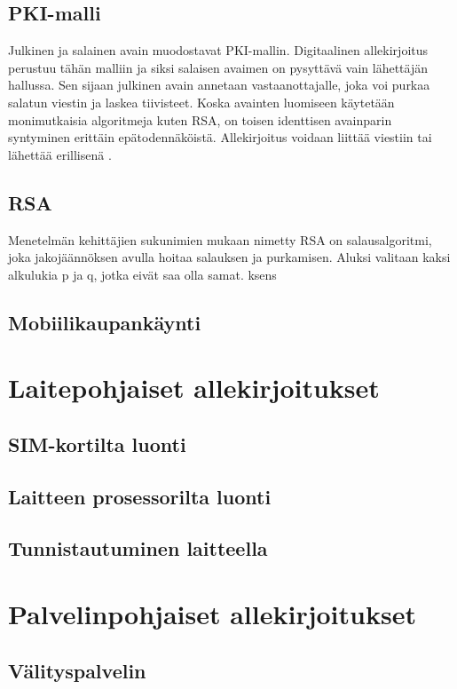 \documentclass[finnish]{tktltiki2}
\theoremstyle{definition}
\theoremstyle{remark}
\begin{document}
\subsection{PKI-malli}

Julkinen ja salainen avain muodostavat PKI-mallin. Digitaalinen allekirjoitus perustuu tähän malliin ja siksi salaisen avaimen on pysyttävä vain lähettäjän hallussa. Sen sijaan julkinen avain annetaan vastaanottajalle, joka voi purkaa salatun viestin ja laskea tiivisteet. Koska avainten luomiseen käytetään monimutkaisia algoritmeja kuten RSA, on toisen identtisen avainparin syntyminen erittäin epätodennäköistä. Allekirjoitus voidaan liittää viestiin tai lähettää erillisenä \cite{moen}.

\subsection{RSA}

Menetelmän kehittäjien sukunimien mukaan nimetty RSA on salausalgoritmi, joka jakojäännöksen avulla hoitaa salauksen ja purkamisen. Aluksi valitaan kaksi alkulukia p ja q, jotka eivät saa olla samat. ksens  

\subsection{Mobiilikaupankäynti}

\section{Laitepohjaiset allekirjoitukset}
\subsection{SIM-kortilta luonti}
\subsection{Laitteen prosessorilta luonti}
\subsection{Tunnistautuminen laitteella}


\section{Palvelinpohjaiset allekirjoitukset}
\subsection{Välityspalvelin}
\end{document}
